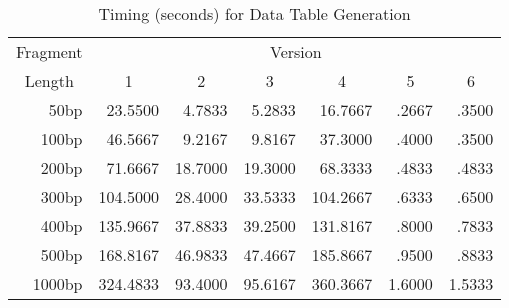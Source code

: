 \begin{table}[bth]
\caption{Timing (seconds) for Data Table Generation}
\label{table1}
\begin{center}
\begin{tabular}{||r|rrrrrr||}  \hline
\multicolumn{1}{||c|}{Fragment} & \multicolumn{6}{c||}{Version} \\ 
\multicolumn{1}{||c|}{Length} & \multicolumn{1}{c}{1} & \multicolumn{1}{c}{2} &
\multicolumn{1}{c}{3} & \multicolumn{1}{c}{4} & \multicolumn{1}{c}{5} &
\multicolumn{1}{c||}{6} \\ \hline
50bp   &  23.5500 &  4.7833 &  5.2833 &  16.7667 &  .2667 &  .3500 \\
100bp  &  46.5667 &  9.2167 &  9.8167 &  37.3000 &  .4000 &  .3500 \\
200bp  &  71.6667 & 18.7000 & 19.3000 &  68.3333 &  .4833 &  .4833 \\
300bp  & 104.5000 & 28.4000 & 33.5333 & 104.2667 &  .6333 &  .6500 \\
400bp  & 135.9667 & 37.8833 & 39.2500 & 131.8167 &  .8000 &  .7833 \\
500bp  & 168.8167 & 46.9833 & 47.4667 & 185.8667 &  .9500 &  .8833 \\
1000bp & 324.4833 & 93.4000 & 95.6167 & 360.3667 & 1.6000 & 1.5333 \\ \hline
\end{tabular}
\end{center}
\end{table}
